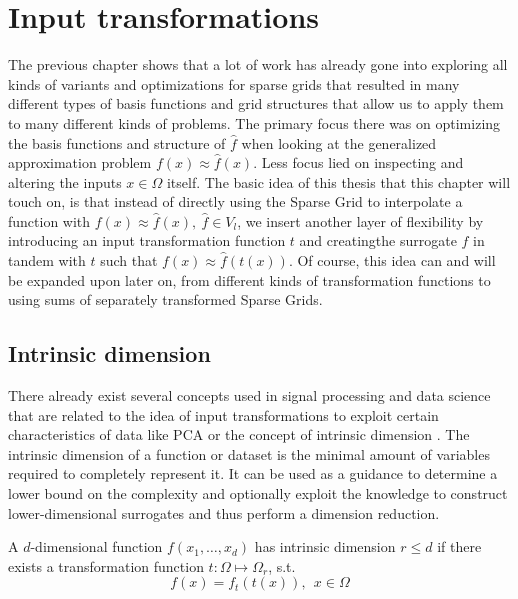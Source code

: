 \documentclass[
  a4paper,  %
  twoside,  %
  bibliography=totoc,
  headsepline,
  cleardoublepage=empty,
  parskip=half,
  draft=false
]{scrbook}
\begin{document}
\chapter{Input transformations}

The previous chapter shows that a lot of work has already gone into exploring all kinds of variants and optimizations for sparse grids that resulted in many different types of basis functions and grid structures that allow us to apply them to many different kinds of problems.
The primary focus there was on optimizing the basis functions and structure of $\hat{f}$ when looking at the generalized approximation problem $f(x) \approx \hat{f}(x)$.
Less focus lied on inspecting and altering the inputs $x \in \Omega$ itself.
The basic idea of this thesis that this chapter will touch on, is that instead of directly using the Sparse Grid to interpolate a function with $f(x) \approx \hat{f}(x), ~ \hat{f} \in V_l$, we insert another layer of flexibility by introducing an input transformation function $t$ and creatingthe surrogate $\hat{f}$ in tandem with $t$ such that $f(x) \approx \hat{f}(t(x))$.
Of course, this idea can and will be expanded upon later on, from different kinds of transformation functions to using sums of separately transformed Sparse Grids.

\section{Intrinsic dimension}

There already exist several concepts used in signal processing and data science that are related to the idea of input transformations to exploit certain characteristics of data like PCA \cite{} or the concept of intrinsic dimension \cite{}.
The intrinsic dimension of a function or dataset is the minimal amount of variables required to completely represent it.
It can be used as a guidance to determine a lower bound on the complexity and optionally exploit the knowledge to construct lower-dimensional surrogates and thus perform a dimension reduction.
\begin{definition}
A $d$-dimensional function $f(x_1, \dots, x_d)$ has intrinsic dimension $r \leq d$ if there exists a transformation function $t \colon \Omega \mapsto \Omega_r$, s.t.
\begin{equation}
f(x)=f_t(t(x)), ~~ x \in \Omega
\end{equation}
\end{definition}
\end{document}
